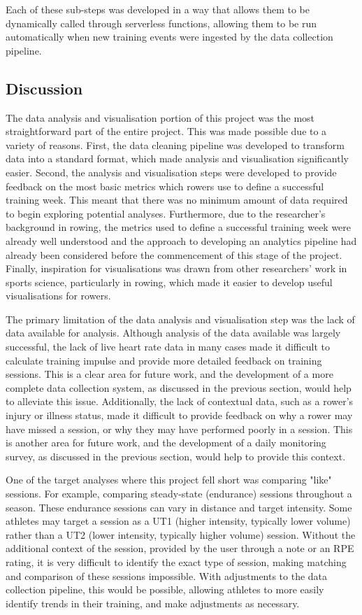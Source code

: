 Each of these sub-steps was developed in a way that allows them to be dynamically called through serverless functions, allowing them to be run automatically when new training events were ingested by the data collection pipeline.

\subsection{Discussion}
The data analysis and visualisation portion of this project was the most straightforward part of the entire project. This was made possible due to a variety of reasons. First, the data cleaning pipeline was developed to transform data into a standard format, which made analysis and visualisation significantly easier. Second, the analysis and visualisation steps were developed to provide feedback on the most basic metrics which rowers use to define a successful training week. This meant that there was no minimum amount of data required to begin exploring potential analyses. Furthermore, due to the researcher's background in rowing, the metrics used to define a successful training week were already well understood and the approach to developing an analytics pipeline had already been considered before the commencement of this stage of the project. Finally, inspiration for visualisations was drawn from other researchers' work in sports science, particularly in rowing, which made it easier to develop useful visualisations for rowers.

The primary limitation of the data analysis and visualisation step was the lack of data available for analysis. Although analysis of the data available was largely successful, the lack of live heart rate data in many cases made it difficult to calculate training impulse and provide more detailed feedback on training sessions. This is a clear area for future work, and the development of a more complete data collection system, as discussed in the previous section, would help to alleviate this issue. Additionally, the lack of contextual data, such as a rower's injury or illness status, made it difficult to provide feedback on why a rower may have missed a session, or why they may have performed poorly in a session. This is another area for future work, and the development of a daily monitoring survey, as discussed in the previous section, would help to provide this context. 

One of the target analyses where this project fell short was comparing "like" sessions. For example, comparing steady-state (endurance) sessions throughout a season. These endurance sessions can vary in distance and target intensity. Some athletes may target a session as a UT1 (higher intensity, typically lower volume) rather than a UT2 (lower intensity, typically higher volume) session. Without the additional context of the session, provided by the user through a note or an RPE rating, it is very difficult to identify the exact type of session, making matching and comparison of these sessions impossible. With adjustments to the data collection pipeline, this would be possible, allowing athletes to more easily identify trends in their training, and make adjustments as necessary.

